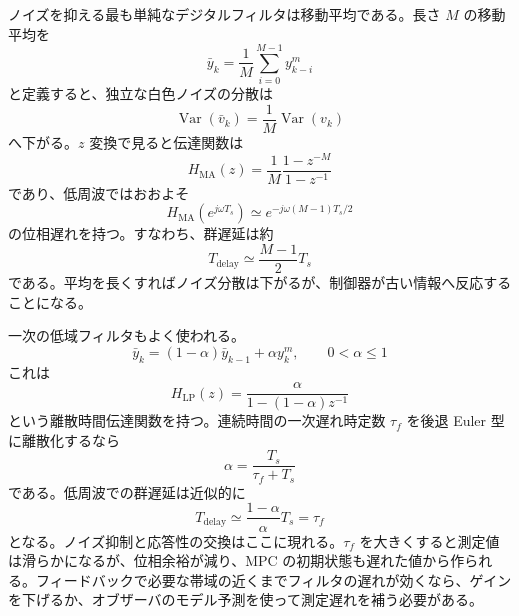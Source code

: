 ノイズを抑える最も単純なデジタルフィルタは移動平均である。長さ $M$ の移動平均を
\begin{equation}
  \bar{y}_k=\frac{1}{M}\sum_{i=0}^{M-1}y_{k-i}^{m}
\end{equation}
と定義すると、独立な白色ノイズの分散は
\begin{equation}
  \operatorname{Var}(\bar{v}_k)=\frac{1}{M}\operatorname{Var}(v_k)
\end{equation}
へ下がる。$z$ 変換で見ると伝達関数は
\begin{equation}
  H_{\mathrm{MA}}(z)
  =
  \frac{1}{M}\frac{1-z^{-M}}{1-z^{-1}}
\end{equation}
であり、低周波ではおおよそ
\begin{equation}
  H_{\mathrm{MA}}(e^{j\omega T_s})
  \simeq
  e^{-j\omega (M-1)T_s/2}
\end{equation}
の位相遅れを持つ。すなわち、群遅延は約
\begin{equation}
  T_{\mathrm{delay}}\simeq\frac{M-1}{2}T_s
\end{equation}
である。平均を長くすればノイズ分散は下がるが、制御器が古い情報へ反応することになる。

一次の低域フィルタもよく使われる。
\begin{equation}
  \bar{y}_k=(1-\alpha)\bar{y}_{k-1}+\alpha y_k^m,
  \qquad
  0<\alpha\le1
\end{equation}
これは
\begin{equation}
  H_{\mathrm{LP}}(z)
  =
  \frac{\alpha}{1-(1-\alpha)z^{-1}}
\end{equation}
という離散時間伝達関数を持つ。連続時間の一次遅れ時定数 $\tau_f$ を後退 Euler 型に離散化するなら
\begin{equation}
  \alpha=\frac{T_s}{\tau_f+T_s}
\end{equation}
である。低周波での群遅延は近似的に
\begin{equation}
  T_{\mathrm{delay}}
  \simeq
  \frac{1-\alpha}{\alpha}T_s
  =
  \tau_f
\end{equation}
となる。ノイズ抑制と応答性の交換はここに現れる。$\tau_f$ を大きくすると測定値は滑らかになるが、位相余裕が減り、MPC の初期状態も遅れた値から作られる。フィードバックで必要な帯域の近くまでフィルタの遅れが効くなら、ゲインを下げるか、オブザーバのモデル予測を使って測定遅れを補う必要がある。

